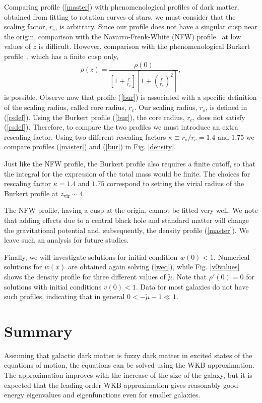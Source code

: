 \documentclass[aps,prl,twocolumn]{revtex4}
\begin{document}
Comparing profile (\ref{master}) with phenomenological profiles of dark matter, obtained from fitting to rotation curves of stars, we must consider that the scaling factor, $r_s$, is arbitrary.  Since our profile does not have a singular cusp near the origin, comparison with the Navarro-Frenk-White (NFW) profile~\cite{NFW} at low values of $z$ is difficult. However, comparison with the phenomenological Burkert profile~\cite{Burkert}, which has a finite cusp only,
\begin{equation}\label{bur}
\rho(z)=\frac{\rho(0)}{\left[1+\frac{r}{r_c}\right]\left[1+\left(\frac{r}{r_c}\right)^2\right]},
\end{equation}
 is possible. Observe now that profile (\ref{bur}) is associated with a specific definition of the scaling radius, called core radius, $r_c$. Our scaling radius, $r_s$, is defined  in (\ref{rsdef}).  Using the Burkert profile (\ref{bur}), the core radius, $r_c$, does not satisfy (\ref{rsdef}).  Therefore, to compare the two profiles we must introduce an extra rescaling factor. Using two different rescaling factors $\kappa \equiv r_s/r_c = 1.4$ and $1.75$ we compare profiles  (\ref{master}) and (\ref{bur}) in Fig. \ref{density}.

Just like the NFW profile, the Burkert profile also requires a finite cutoff, so that the integral for the expression of the total mass would be finite. The choices for  rescaling factor $\kappa = 1.4$ and $1.75$ correspond to setting the virial radius of the Burkert profile at $z_\text{vir} \sim 4$.

The NFW profile, having a cusp at the origin, cannot be fitted very well. We note that adding effects due to a central black hole and standard matter will change the gravitational potential and, subsequently, the density profile (\ref{master}).  We leave such an analysis for future studies.

Finally, we will investigate solutions for initial condition $w(0)<1$.  Numerical solutions for $w(x)$ are obtained again solving (\ref{weq}), while Fig. \ref{v0values} shows the density profile for three different values of $\tilde{\mu}$.  Note that  $\rho'(0)=0$ for solutions with initial conditions $v(0)< 1$. Data for most galaxies do not have such profiles, indicating that in general $0<-\tilde\mu-1\ll 1$.

\section{Summary}
Assuming that galactic dark matter is fuzzy dark matter in excited states of the equations of motion,  the equations can be solved using the WKB approximation. The approximation improves with the increase of the size of the galaxy, but it is expected that the leading order WKB approximation gives reasonably good energy eigenvalues and eigenfunctions even for smaller galaxies. 
\end{document}
